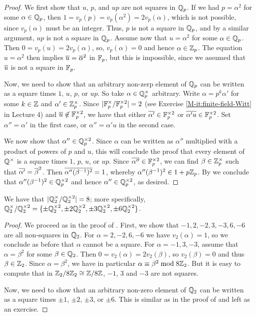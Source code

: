 \documentclass[12pt, leqno, british]{amsart}
\begin{document}
\begin{proof}
We first show that $u$, $p$, and $up$ are not squares in $\mathbb Q_p$.
If we had $p = \alpha^2$ for some $\alpha \in \mathbb Q_p$, then $1 = v_p(p) = v_p(\alpha^2) = 2v_p(\alpha)$, which is not possible, since $v_p(\alpha)$ must be an integer.
Thus, $p$ is not a square in $\mathbb Q_p$, and by a similar argument, $up$ is not a square in $\mathbb Q_p$.
Assume now that $u = \alpha^2$ for some $\alpha \in \mathbb Q_p$.
Then $0 = v_p(u) = 2v_p(\alpha)$, so, $v_p(\alpha) = 0$ and hence $\alpha \in \mathbb Z_p$.
The equation $u = \alpha^2$ then implies $\overline{u} = \overline{\alpha}^2$ in $\mathbb F_p$, but this is impossible, since we assumed that $\overline{u}$ is not a square in $\mathbb F_p$.

Now, we need to show that an arbitrary non-zerp element of $\mathbb Q_p$ can be written as a square times $1$, $u$, $p$, or $up$.
So take $\alpha \in \mathbb Q_p^\times$ arbitrary.
Write $\alpha = p^k \alpha'$ for some $k \in \mathbb Z$ and $\alpha' \in \mathbb Z_p^\times$.
Since $\lvert \mathbb F_p^\times / \mathbb F_p^{\times 2} \rvert = 2$ (see Exercise \eqref{M-it:finite-field-Witt} in Lecture 4) and $\overline{u} \not\in \mathbb F_p^{\times 2}$, we have that either $\overline{\alpha'} \in \mathbb F_p^{\times 2}$ or $\overline{\alpha'u} \in \mathbb F_p^{\times 2}$.
Set $\alpha'' = \alpha'$ in the first case, or $\alpha'' = \alpha'u$ in the second case.

We now show that $\alpha'' \in \mathbb Q_p^{\times 2}$.
Since $\alpha$ can be written as $\alpha''$ multiplied with a product of powers of $p$ and $u$, this will conclude the proof that every element of $\mathbb Q^\times$ is a square times $1$, $p$, $u$, or $up$.
Since $\overline{\alpha''} \in \mathbb F_p^{\times 2}$, we can find $\beta \in \mathbb Z_p^\times$ such that $\overline{\alpha'} = \overline{\beta}^2$.
Then $\overline{\alpha''(\beta^{-1})^2} = 1$, whereby $\alpha''(\beta^{-1})^2 \in 1 + p\mathbb Z_p$.
By  we conclude that $\alpha''(\beta^{-1})^2 \in \mathbb Q_p^{\times 2}$ and hence $\alpha'' \in \mathbb Q_p^{\times 2}$, as desired.
\end{proof}
\begin{cor}\label{C:qq2-squares}
We have that $\lvert \mathbb Q_2^\times/\mathbb Q_2^{\times 2} \rvert = 8$; more specifically, $\mathbb Q_2^\times/\mathbb Q_2^{\times 2} = \lbrace \pm\mathbb Q_2^{\times 2}, \pm 2\mathbb Q_2^{\times 2}, \pm 3\mathbb Q_2^{\times 2}, \pm 6 \mathbb Q_2^{\times 2} \rbrace$.
\end{cor}
\begin{proof}
We proceed as in the proof of .
First, we show that $-1, 2, -2, 3, -3, 6, -6$ are all non-squares in $\mathbb Q_2$.
For $\alpha = 2, -2, 6, -6$ we have $v_2(\alpha)=1$, so we conclude as before that $\alpha$ cannot be a square.
For $\alpha = -1, 3, -3$, assume that $\alpha = \beta^2$ for some $\beta \in \mathbb Q_2$.
Then $0 = v_2(\alpha) = 2v_2(\beta)$, so $v_2(\beta) = 0$ and thus $\beta \in \mathbb Z_2$.
Since $\alpha = \beta^2$, we have in particular $\alpha \equiv \beta^2 \bmod 8\mathbb Z_2$.
But it is easy to compute that in $\mathbb Z_2/8\mathbb Z_2 \cong \mathbb Z/8\mathbb Z$, $-1$, $3$ and $-3$ are not squares.

Now, we need to show that an arbitrary non-zero element of $\mathbb Q_2$ can be written as a square times $\pm 1$, $\pm 2$, $\pm 3$, or $\pm 6$.
This is similar as in the proof of  and left as an exercise.
\end{proof}
\end{document}
